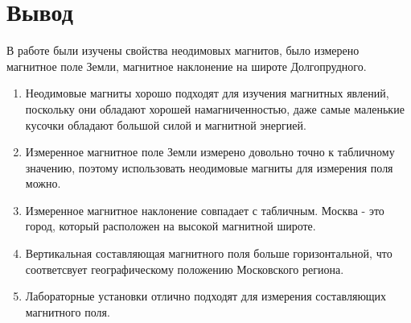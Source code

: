 \documentclass[a4paper, 10pt]{article}
\begin{document}
\section*{Вывод}
    В работе были изучены свойства неодимовых магнитов, было измерено магнитное поле Земли, магнитное наклонение на широте Долгопрудного.
    \begin{enumerate}
        \item Неодимовые магниты хорошо подходят для изучения магнитных явлений, поскольку они обладают хорошей намагниченностью, даже самые
        маленькие кусочки обладают большой силой и магнитной энергией.
        \item Измеренное магнитное поле Земли измерено довольно точно к табличному значению, поэтому использовать неодимовые магниты для измерения поля можно.
        \item Измеренное магнитное наклонение совпадает с табличным. Москва - это город, который расположен на высокой магнитной широте.
        \item Вертикальная  составляющая магнитного поля больше горизонтальной, что соответсвует географическому положению Московского региона.
        \item Лабораторные установки отлично подходят для измерения составляющих магнитного поля.
    \end{enumerate}
\end{document}
